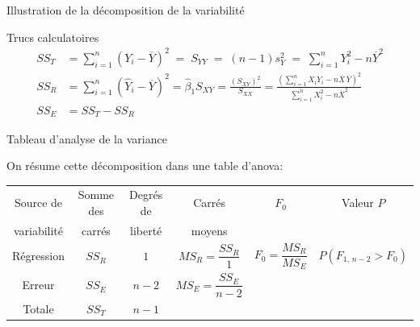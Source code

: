 \documentclass{BeamerTemplate}
\begin{document}
\begin{frame}{Illustration de la décomposition de la variabilité}
\begin{center}
    

\end{center}
\end{frame}
\begin{frame}[t]{Trucs calculatoires}
\begin{align*}
SS_T&=\sum_{i=1}^n(Y_i-\overline{Y})^2\;=\;S_{YY}\;=\;(n-1)s^2_Y\;=\;\sum_{i=1}^nY_i^2-n\overline{Y}^2\\[4mm]
SS_R&=\sum_{i=1}^n(\hat{Y}_i-\overline{Y})^2=\hat{\beta}_1S_{XY}=\frac{(S_{XY})^2}{S_{XX}}
=\frac{\left(\sum\limits_{i=1}^nX_iY_i-n\overline{X}\,\overline{Y}\right)^2}{\sum\limits_{i=1}^nX^2_i-n\overline{X}^2}\\[5mm]
SS_E&=SS_T-SS_R
\end{align*}
\end{frame}

\begin{frame}[t]{Tableau d'analyse de la variance}

On résume  cette décomposition dans une table d'anova:


\begin{center}

{\renewcommand{\baselinestretch}{3}
{\scriptsize
\begin{tabular}{cccccc}\hline
Source de & Somme des & Degrés de & Carrés  & $F_0$ & Valeur $P$ \\[-4mm]
variabilité & carrés & liberté & moyens & & \\ \hline
Régression & $SS_{R}$ & $1$ & $MS_{R}=\dfrac{SS_R}{1}$ & $F_0=\dfrac{MS_{R}}{MS_E}$ & $P(F_{1,\,n-2}>F_0)$ \\
Erreur & $SS_E$ & $n-2$ & $MS_E=\dfrac{SS_E}{n-2}$ & & \\ \hline
Totale & $SS_T$ & $n-1$ & & & \\ \hline
\end{tabular}
}
    
}
\end{center}

\end{frame}
\end{document}
